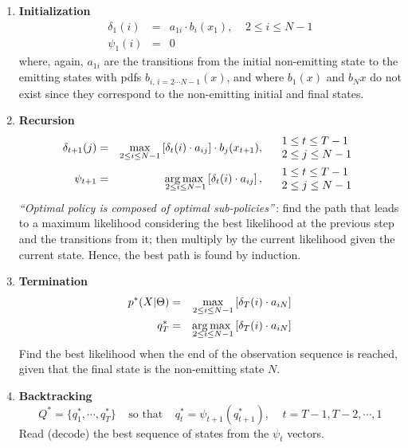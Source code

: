 \documentclass[twoside,a4paper,titlepage]{article}
\begin{document}
\begin{enumerate}
\item {\bf Initialization}
%
	\begin{eqnarray}
		\delta_1(i) & = & a_{1i} \cdot b_i(x_1), \;\;\;\; 2 \leq i \leq N-1 \nonumber \\
		\psi_1(i) & = & 0 \nonumber
	\end{eqnarray}
%
where, again, $a_{1i}$ are the transitions from the initial non-emitting
state to the emitting states with pdfs $b_{i,\,i = 2 \cdots N-1}(x)$, and
where $b_1(x)$ and $b_N{x}$ do not exist since they correspond to the
non-emitting initial and final states.
%
\item {\bf Recursion}
	\begin{eqnarray}
		\delta_{t+1}(j) & = & \max_{2 \leq i \leq N-1}
			\left[ \delta_{t}(i) \cdot a_{ij} \right]
			\cdot b_j(x_{t+1}),
		\;\;\;\; \begin{array}{l} 1 \leq t \leq T-1 \\ 2 \leq j \leq N-1 \end{array}
		\nonumber \\
		\psi_{t+1} & = & \mbox{arg}\hspace{-0.5ex}\max_{\hspace{-3ex}2 \leq i \leq N-1}
		\left[ \delta_{t}(i) \cdot a_{ij} \right],
		\;\;\;\; \begin{array}{l} 1 \leq t \leq T-1 \\ 2 \leq j \leq N-1 \end{array}
		\nonumber
	\end{eqnarray}
%
{\it ``Optimal policy is composed of optimal sub-policies''}\,: find the
path that leads to a maximum likelihood considering the best likelihood at
the previous step and the transitions from it; then multiply by the current
likelihood given the current state. Hence, the best path is found by
induction.
\item {\bf Termination}
	\begin{eqnarray}
		p^*(X|\Theta) & = & \max_{2 \leq i \leq N-1}
			\left[ \delta_{T}(i) \cdot a_{iN} \right] \nonumber \\
		q_T^* & = & \mbox{arg}\hspace{-0.5ex}\max_{\hspace{-3ex}2 \leq i \leq N-1}
			\left[ \delta_{T}(i) \cdot a_{iN} \right]
		\nonumber
	\end{eqnarray}
%
Find the best likelihood when the end of the observation sequence is
reached, given that the final state is the non-emitting state $N$.
%
\item {\bf Backtracking}
	\[
		Q^* = \{q_1^*,\cdots,q_T^*\} \;\;\;\;\mbox{so that}\;\;\;\;
		q_t^* = \psi_{t+1}(q_{t+1}^*), \;\;\;\; t = T-1, T-2, \cdots, 1
	\]
%
Read (decode) the best sequence of states from the $\psi_t$ vectors.
\end{enumerate}
\end{document}
